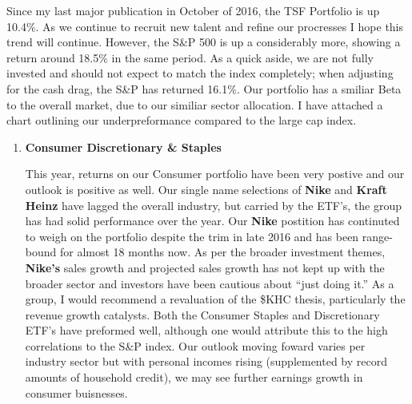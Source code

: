 \documentclass[11pt,pressrelease]{newlfm} %
\begin{document}
\begin{newlfm}


\begin{singlespace} 		%
Since my last major publication in October of 2016, the TSF Portfolio is up 10.4\%. As we continue to recruit new talent and refine our procresses I hope this trend will continue. However, the S\&P 500 is up a considerably more, showing a return around 18.5\% in the same period. As a quick aside, we are not fully invested and should not expect to match the index completely; when adjusting for the cash drag, the S\&P has returned 16.1\%. Our portfolio has a smiliar Beta to the overall market, due to our similiar sector allocation. I have attached a chart outlining our underpreformance compared to the large cap index. %

\begin{enumerate}
\item \textbf{Consumer Discretionary \& Staples} \par
This year, returns on our Consumer portfolio have been very postive and our outlook is positive as well. Our single name selections of \textbf{Nike} and \textbf{Kraft Heinz} have lagged the overall industry, but carried by the ETF's, the group has had solid performance over the year. Our \textbf{Nike} postition has continuted to weigh on the portfolio despite the trim in late 2016 and has been range-bound for almost 18 months now. As per the broader investment themes, \textbf{Nike's} sales growth and projected sales growth has not kept up with the broader sector and investors have been cautious about ``just doing it.'' As a group, I would recommend a revaluation of the \$KHC thesis, particularly the revenue growth catalysts. Both the Consumer Staples and Discretionary ETF’s have preformed well, although one would attribute this to the high correlations to the S\&P index. Our outlook moving foward varies per industry sector but with personal incomes rising (supplemented by record amounts of household credit), we may see further earnings growth in consumer buisnesses. %


\end{enumerate}
\end{singlespace}
\end{newlfm}
\end{document}
